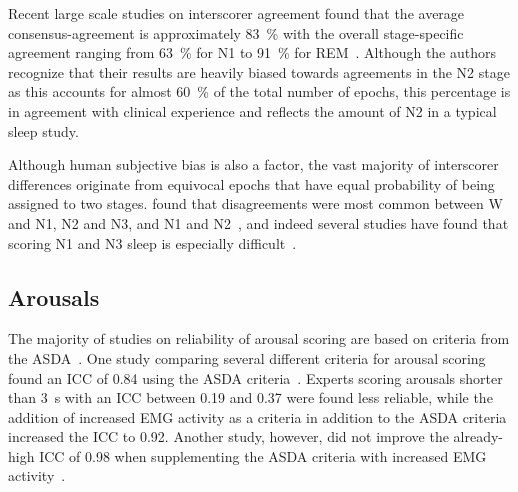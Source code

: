             Recent large scale studies on interscorer agreement found that the average consensus-agreement is approximately \SI{83}{\percent} with the overall stage-specific agreement ranging from \SI{63}{\percent} for \ac{N1} to \SI{91}{\percent} for REM~\cite{Rosenberg2013}.
            Although the authors recognize that their results are heavily biased towards agreements in the \ac{N2} stage as this accounts for almost \SI{60}{\percent} of the total number of epochs, this percentage is in agreement with clinical experience and reflects the amount of \ac{N2} in a typical sleep study.
            
            Although human subjective bias is also a factor, the vast majority of interscorer differences originate from equivocal epochs that have equal probability of being assigned to two stages. 
            \citeauthor{Younes2016} found that disagreements were most common between \ac{W} and \ac{N1}, \ac{N2} and \ac{N3}, and \ac{N1} and \ac{N2}~\cite{Younes2016}, and indeed several studies have found that scoring \ac{N1} and \ac{N3} sleep is especially difficult~\cite{Danker-Hopfe2004,Rosenberg2013,Zhang2015a,Younes2018}.
            
        
        \subsection{Arousals}\label{sec:challenges-arousals}
        
            The majority of studies on reliability of arousal scoring are based on criteria from the \ac{ASDA}~\cite{Bonnet2007}.
            One study comparing several different criteria for arousal scoring found an \ac{ICC} %
            of 0.84 using the \ac{ASDA} criteria~\cite{Loredo1999}. 
            Experts scoring arousals shorter than \SI{3}{\second} with an \ac{ICC} between 0.19 and 0.37 were found less reliable, while the addition of increased \ac{EMG} activity as a criteria in addition to the \ac{ASDA} criteria increased the \ac{ICC} to 0.92.
            Another study, however, did not improve the already-high \ac{ICC} of 0.98 when supplementing the \ac{ASDA} criteria with increased \ac{EMG} activity~\cite{Smurra2001}.
            
